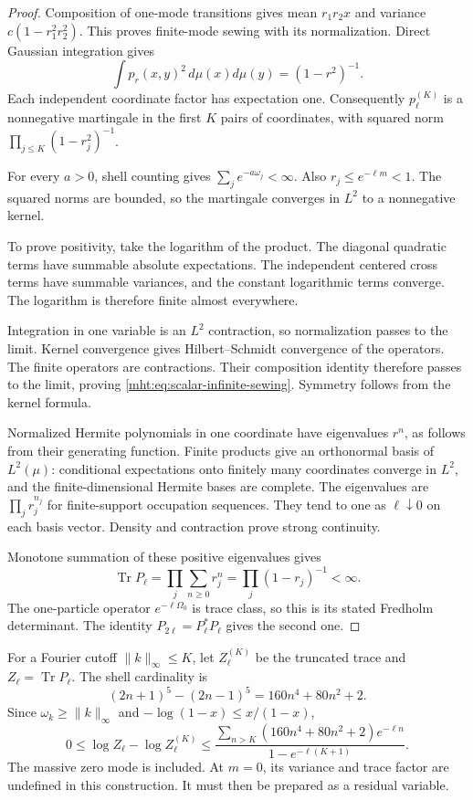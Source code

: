 \begin{proof}
Composition of one-mode transitions gives mean $r_1r_2x$
and variance $c(1-r_1^2r_2^2)$. This proves finite-mode
sewing with its normalization. Direct Gaussian integration gives
\[
 \int p_r(x,y)^2\,d\mu(x)d\mu(y)=(1-r^2)^{-1}.
\]
Each independent coordinate factor has expectation one.
Consequently $p_\ell^{(K)}$ is a nonnegative martingale in
the first $K$ pairs of coordinates, with squared norm
$\prod_{j\leq K}(1-r_j^2)^{-1}$.

For every $a>0$, shell counting gives
$\sum_je^{-a\omega_j}<\infty$. Also $r_j\leq e^{-\ell m}<1$.
The squared norms are bounded, so the martingale converges
in $L^2$ to a nonnegative kernel.

To prove positivity, take the logarithm of the product.
The diagonal quadratic terms have summable absolute expectations.
The independent centered cross terms have summable variances,
and the constant logarithmic terms converge.
The logarithm is therefore finite almost everywhere.

Integration in one variable is an $L^2$ contraction, so
normalization passes to the limit. Kernel convergence gives
Hilbert--Schmidt convergence of the operators.
The finite operators are contractions. Their composition
identity therefore passes to the limit, proving
\eqref{mht:eq:scalar-infinite-sewing}.
Symmetry follows from the kernel formula.

Normalized Hermite polynomials in one coordinate have eigenvalues
$r^n$, as follows from their generating function.
Finite products give an orthonormal basis of $L^2(\mu)$:
conditional expectations onto finitely many coordinates
converge in $L^2$, and the finite-dimensional Hermite bases
are complete. The eigenvalues are
$\prod_jr_j^{n_j}$ for finite-support occupation sequences.
They tend to one as $\ell\downarrow0$ on each basis vector.
Density and contraction prove strong continuity.

Monotone summation of these positive eigenvalues gives
\[
 \operatorname{Tr}P_\ell
       =\prod_j\sum_{n\geq0}r_j^n
       =\prod_j(1-r_j)^{-1}<\infty.
\]
The one-particle operator $e^{-\ell\Omega_0}$ is trace class,
so this is its stated Fredholm determinant.
The identity $P_{2\ell}=P_\ell^*P_\ell$ gives the second one.
\end{proof}

For a Fourier cutoff $\|k\|_\infty\leq K$, let
$Z_\ell^{(K)}$ be the truncated trace and
$Z_\ell=\operatorname{Tr}P_\ell$. The shell cardinality is
\[
 (2n+1)^5-(2n-1)^5=160n^4+80n^2+2.
\]
Since $\omega_k\geq\|k\|_\infty$ and
$-\log(1-x)\leq x/(1-x)$,
\begin{equation}\label{mht:eq:scalar-fredholm-tail}
 0\leq\log Z_\ell-\log Z_\ell^{(K)}
 \leq\frac{\sum_{n>K}(160n^4+80n^2+2)e^{-\ell n}}
                                  {1-e^{-\ell(K+1)}}.
\end{equation}
The massive zero mode is included. At $m=0$, its variance
and trace factor are undefined in this construction.
It must then be prepared as a residual variable.

